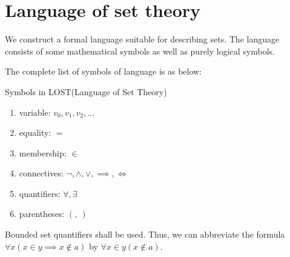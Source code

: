 \section{Language of set theory}

We construct a formal language suitable for describing sets. The language consists of some mathematical symbols as well as purely logical symbols.

The complete list of symbols of language is as below:
\begin{definition}{Symbols in LOST(Language of Set Theory)}{}
    \begin{enumerate}
        \item variable: $v_0, v_1, v_2, \ldots$
        \item equality: $=$
        \item membership: $\in$
        \item connectives: $\neg, \land, \lor, \implies, \iff$
        \item quantifiers: $\forall, \exists$
        \item parentheses: $(,\ )$
    \end{enumerate}
\end{definition}

\begin{remark}
    Bounded set quantifiers shall be used. Thus, we can abbreviate the formula\\
    $\forall x (x \in y \implies x \notin a)$ by $\forall x \in y (x \notin a).$
\end{remark}

